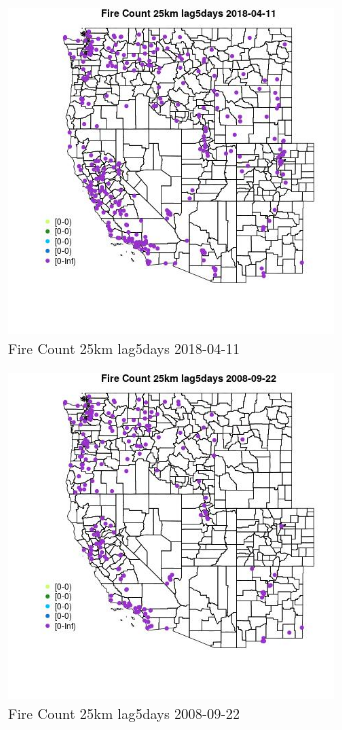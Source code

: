 \begin{figure} 
\centering  
\includegraphics[width=0.77\textwidth]{Code_Outputs/Report_ML_input_PM25_Step4_part_e_de_duplicated_aves_compiled_2019-05-18wNAs_MapObsFire_Count_25km_lag5days2018-04-11.jpg} 
\caption{\label{fig:Report_ML_input_PM25_Step4_part_e_de_duplicated_aves_compiled_2019-05-18wNAsMapObsFire_Count_25km_lag5days2018-04-11}Fire Count 25km lag5days 2018-04-11} 
\end{figure} 
 

\begin{figure} 
\centering  
\includegraphics[width=0.77\textwidth]{Code_Outputs/Report_ML_input_PM25_Step4_part_e_de_duplicated_aves_compiled_2019-05-18wNAs_MapObsFire_Count_25km_lag5days2008-09-22.jpg} 
\caption{\label{fig:Report_ML_input_PM25_Step4_part_e_de_duplicated_aves_compiled_2019-05-18wNAsMapObsFire_Count_25km_lag5days2008-09-22}Fire Count 25km lag5days 2008-09-22} 
\end{figure} 
 

